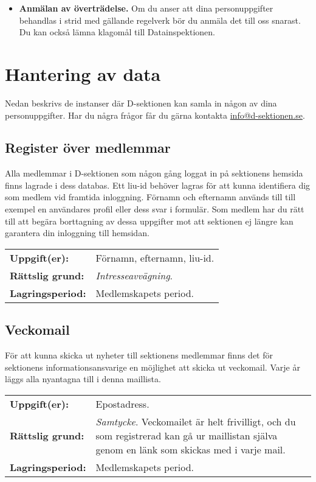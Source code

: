 \documentclass{datateknologsektionen-document}
\makeatletter
\newcommand*{\infomail}{\href{mailto://info@d-sektionen.se}{info@d-sektionen.se}}
\makeatother
\begin{document}
\begin{itemize}
  \item \textbf{Anmälan av överträdelse.} Om du anser att dina personuppgifter behandlas i strid med gällande regelverk bör du anmäla det till oss snarast. Du kan också lämna klagomål till Datainspektionen.
\end{itemize}

\section{Hantering av data}
Nedan beskrivs de instanser där D-sektionen kan samla in någon av dina personuppgifter. Har
du några frågor får du gärna kontakta \infomail{}.

\subsection{Register över medlemmar}
Alla medlemmar i D-sektionen som någon gång loggat in på sektionens hemsida finns lagrade i dess databas.
Ett liu-id behöver lagras för att kunna identifiera dig som medlem vid framtida inloggning.
Förnamn och efternamn används till till exempel en användares profil eller dess svar i formulär.
Som medlem har du rätt till att begära borttagning av dessa uppgifter mot att sektionen ej längre kan garantera din inloggning till hemsidan.

\begin{longtabu}{l X}
  \textbf{Uppgift(er):}    & Förnamn, efternamn, liu-id. \\
  \textbf{Rättslig grund:} & \textit{Intresseavvägning}. \\
  \textbf{Lagringsperiod:} & Medlemskapets period.
\end{longtabu}

\subsection{Veckomail}
För att kunna skicka ut nyheter till sektionens medlemmar finns det för sektionens informationsansvarige en möjlighet att skicka ut veckomail.
Varje år läggs alla nyantagna till i denna maillista.

\begin{longtabu}{l X}
  \textbf{Uppgift(er):}    & Epostadress. \\
  \textbf{Rättslig grund:} & \textit{Samtycke}. Veckomailet är helt frivilligt, och du som registrerad kan gå ur maillistan själva genom en länk som skickas med i varje mail. \\
  \textbf{Lagringsperiod:} & Medlemskapets period.
\end{longtabu}
\end{document}
